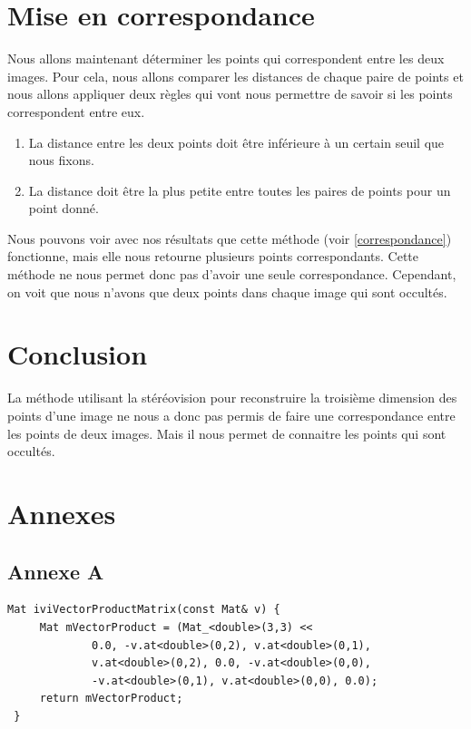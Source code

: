 \documentclass[a4paper,10pt]{article}
\begin{document}
\section{Mise en correspondance}
Nous allons maintenant déterminer les points qui correspondent entre les deux images. Pour cela, nous 
allons comparer les distances de chaque paire de points et nous allons appliquer deux règles qui vont 
nous permettre de savoir si les points correspondent entre eux.
\begin{enumerate}
 \item La distance entre les deux points doit être inférieure à un certain seuil que nous fixons.
 \item La distance doit être la plus petite entre toutes les paires de points pour un point donné.
\end{enumerate}
Nous pouvons voir avec nos résultats que cette méthode (voir \ref{correspondance}) fonctionne, mais elle nous retourne plusieurs
points correspondants. Cette méthode ne nous permet donc pas d'avoir une seule correspondance. Cependant, on voit que nous n'avons
que deux points dans chaque image qui sont occultés.

\section{Conclusion}
La méthode utilisant la stéréovision pour reconstruire la troisième dimension des points d'une image
ne nous a donc pas permis de faire une correspondance entre les points de deux images. Mais il nous permet
de connaitre les points qui sont occultés.
\section{Annexes}
\subsection{Annexe A}
\label{AproduitVector}
\begin{lstlisting}[caption=Calcul produit vectoriel]
 Mat iviVectorProductMatrix(const Mat& v) {
     Mat mVectorProduct = (Mat_<double>(3,3) <<
             0.0, -v.at<double>(0,2), v.at<double>(0,1),
             v.at<double>(0,2), 0.0, -v.at<double>(0,0),
             -v.at<double>(0,1), v.at<double>(0,0), 0.0);
     return mVectorProduct;
 }
\end{lstlisting}
\end{document}
